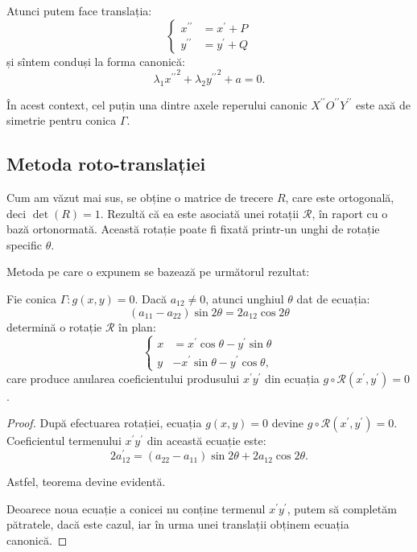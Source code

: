 Atunci putem face translația: 
 \[
	\begin{cases}	
	    x^{\prime\prime} &= x^{\prime} + P \\
	    y^{\prime\prime} &= y^{\prime} + Q
    \end{cases}
\]
și sîntem conduși la forma canonică: 
 \[
	\lambda_1 {x^{\prime\prime}}^2 + \lambda_2 {y^{\prime\prime}}^2 + a = 0.
\]

În acest context, cel puțin una dintre axele reperului canonic
$X^{\prime\prime} O^{\prime\prime} Y^{\prime\prime}$ este axă de simetrie pentru
conica $\Gamma$.


\subsection{Metoda roto-translației}

\indent\indent Cum am văzut mai sus, se obține o matrice de trecere $R$, care
este ortogonală, deci $\det(R) = 1$. Rezultă că ea este asociată unei rotații
$\mathcal{R}$, în raport cu o bază ortonormată. Această rotație poate fi fixată
printr-un unghi de rotație specific $\theta$.

Metoda pe care o expunem se bazează pe următorul rezultat:

\begin{theorem}
	Fie conica $\Gamma: g(x, y) = 0$. Dacă $a_{12} \neq 0$, atunci unghiul
$\theta$ dat de ecuația: 
 \[
	(a_{11} - a_{22}) \sin 2 \theta = 2a_{12} \cos 2 \theta
\]
determină o rotație $\mathcal{R}$ în plan: 
 \[
	\begin{cases}	
	    x &= x^{\prime} \cos \theta - y^{\prime} \sin \theta \\
	    y &- x^{\prime} \sin \theta - y^{\prime} \cos \theta,
    \end{cases}
\]
care produce anularea coeficientului produsului $x^{\prime}y^{\prime}$ din 
ecuația $g \circ \mathcal{R}(x^{\prime}, y^{\prime}) = 0$.
\end{theorem}

\begin{proof}
	După efectuarea rotației, ecuația $g(x, y) = 0$ devine 
$g \circ \mathcal{R}(x^{\prime}, y^{\prime}) = 0$. Coeficientul termenului
$x^{\prime} y^{\prime}$ din această ecuație este: 
 \[
	2a_{12}^{\prime} = (a_{22} - a_{11}) \sin 2 \theta + 2a_{12} \cos 2 \theta.
\]

Astfel, teorema devine evidentă.

Deoarece noua ecuație a conicei nu conține termenul $x^{\prime} y^{\prime}$, 
putem să completăm pătratele, dacă este cazul, iar în urma unei translații
obținem ecuația canonică.
\end{proof}

